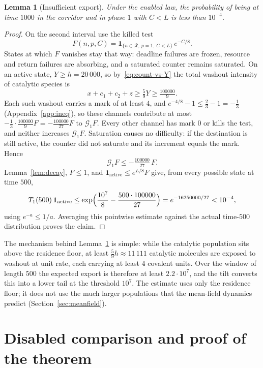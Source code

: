 \documentclass[11pt,a4paper]{article}
\theoremstyle{plain}
\newtheorem{lemma}[theorem]{Lemma}
\theoremstyle{definition}
\theoremstyle{remark}
\newcommand{\G}{\mathcal G}
\newcommand{\R}{\mathcal R}
\newcommand{\ind}{\mathbf 1}
\begin{document}
\begin{lemma}[Insufficient export]\label{lem:output}
Under the enabled law, the probability of being at time $1000$ in the corridor and in phase $1$ with $C<L$ is less than $10^{-4}$.
\end{lemma}
\begin{proof}
On the second interval use the killed test
\[
F(n,p,C)=\ind_{\{n\in\R,\ p=1,\ C<L\}}\,e^{-C/8}.
\]
States at which $F$ vanishes stay that way: deadline failures are frozen, resource and return failures are absorbing, and a saturated counter remains saturated. On an active state, $Y\ge h=20\,000$, so by~\eqref{eq:count-vs-Y} the total washout intensity of catalytic species is
\[
x+c_1+c_2+z\ge\tfrac59Y\ge\tfrac{100000}9 .
\]
Each such washout carries a mark of at least $4$, and $e^{-4/8}-1\le\frac23-1=-\frac13$ (Appendix~\ref{app:ineq}), so these channels contribute at most $-\frac13\cdot\frac{100000}9F=-\frac{100000}{27}F$ to $\G_1F$. Every other channel has mark $0$ or kills the test, and neither increases $\G_1F$. Saturation causes no difficulty: if the destination is still active, the counter did not saturate and its increment equals the mark. Hence
\[
\G_1F\le-\tfrac{100000}{27}\,F .
\]
Lemma~\ref{lem:decay}, $F\le1$, and $\ind_{\mathrm{active}}\le e^{L/8}F$ give, from every possible state at time $500$,
\begin{equation}\label{eq:output}
T_1(500)\,\ind_{\mathrm{active}}\le\exp\Bigl(\frac{10^7}8-\frac{500\cdot100000}{27}\Bigr)=e^{-16250000/27}<10^{-4},
\end{equation}
using $e^{-a}\le1/a$. Averaging this pointwise estimate against the actual time-$500$ distribution proves the claim.
\end{proof}

The mechanism behind Lemma~\ref{lem:output} is simple: while the catalytic population sits above the residence floor, at least $\frac59h\approx11\,111$ catalytic molecules are exposed to washout at unit rate, each carrying at least $4$ covalent units. Over the window of length $500$ the expected export is therefore at least $2.2\cdot10^7$, and the tilt converts this into a lower tail at the threshold $10^7$. The estimate uses only the residence floor; it does not use the much larger populations that the mean-field dynamics predict (Section~\ref{sec:meanfield}).

\section{Disabled comparison and proof of the theorem}\label{sec:disabled}
\end{document}
